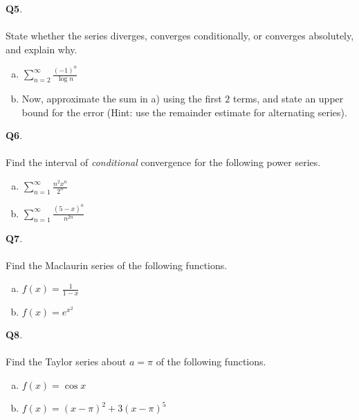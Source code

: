 \documentclass[12pt, oneside]{amsart}
\begin{document}
\newpage
\noindent
\textbf{Q5}. \\ \\ State whether the series diverges, converges conditionally, or converges absolutely, and explain why. \\
\begin{enumerate}[a)]
  \item
$\displaystyle{\sum_{n=2}^{\infty} \frac{(-1)^{n}}{\log n}}$
    \vspace{9cm}
\item
Now, approximate the sum in a) using the first $2$ terms, and state an upper bound for the error (Hint: use the remainder estimate for alternating series).
  \newpage
\end{enumerate}
\textbf{Q6}. \\ \\ Find the interval of \emph{conditional} convergence for the following power series.\\
\begin{enumerate}[a)]
  \item
$\displaystyle{\sum_{n=1}^{\infty} \frac{n^{2} x^{n}}{2^{n}}}$
\vspace{9cm}
\item
  $ \displaystyle{\sum_{n=1}^{\infty} \frac{{(5-x)^{n}}}{n^{2n}}}$
  \newpage
\end{enumerate}




\newpage
\noindent
\textbf{Q7}. \\ \\ Find the Maclaurin series of the following functions.\\
\begin{enumerate}[a)]
  \item
    $\displaystyle{f(x) = \frac{1}{1-x}}$
    \vspace{9cm}
  \item
    $\displaystyle{f(x) = e^{x^{2}}}$
  \newpage
\end{enumerate}

\noindent
\textbf{Q8}. \\ \\ Find the Taylor series about $a=\pi$ of the following functions.\\
\begin{enumerate}[a)]
  \item
    $\displaystyle{f(x) = \cos x}$
    \vspace{9cm}
  \item
    $\displaystyle{f(x) = (x-\pi)^{2} + 3(x-\pi)^{5}}$
  \newpage
\end{enumerate}
\end{document}
